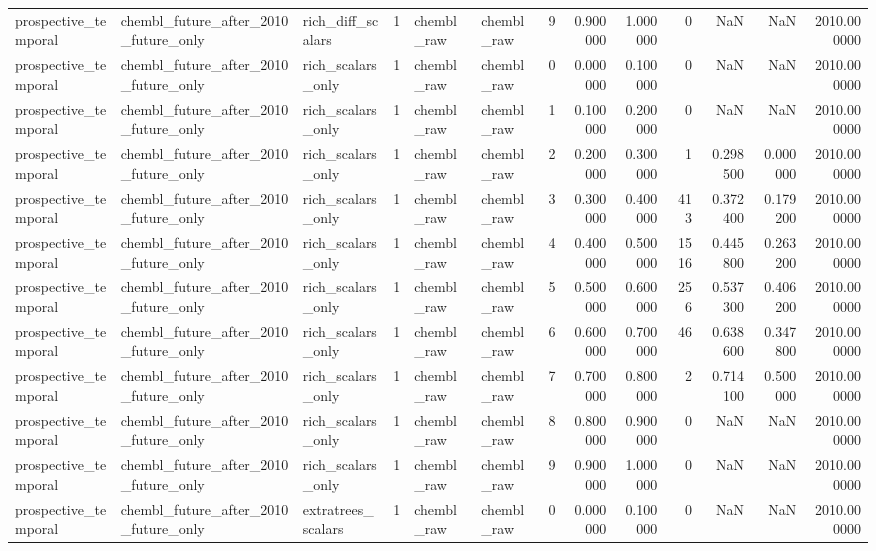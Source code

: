\begin{longtable}{lllrllrrrrrrr}
prospective\_temporal & chembl\_future\_after\_2010\_future\_only & rich\_diff\_scalars & 1 & chembl\_raw & chembl\_raw & 9 & 0.900000 & 1.000000 & 0 & NaN & NaN & 2010.000000 \\
prospective\_temporal & chembl\_future\_after\_2010\_future\_only & rich\_scalars\_only & 1 & chembl\_raw & chembl\_raw & 0 & 0.000000 & 0.100000 & 0 & NaN & NaN & 2010.000000 \\
prospective\_temporal & chembl\_future\_after\_2010\_future\_only & rich\_scalars\_only & 1 & chembl\_raw & chembl\_raw & 1 & 0.100000 & 0.200000 & 0 & NaN & NaN & 2010.000000 \\
prospective\_temporal & chembl\_future\_after\_2010\_future\_only & rich\_scalars\_only & 1 & chembl\_raw & chembl\_raw & 2 & 0.200000 & 0.300000 & 1 & 0.298500 & 0.000000 & 2010.000000 \\
prospective\_temporal & chembl\_future\_after\_2010\_future\_only & rich\_scalars\_only & 1 & chembl\_raw & chembl\_raw & 3 & 0.300000 & 0.400000 & 413 & 0.372400 & 0.179200 & 2010.000000 \\
prospective\_temporal & chembl\_future\_after\_2010\_future\_only & rich\_scalars\_only & 1 & chembl\_raw & chembl\_raw & 4 & 0.400000 & 0.500000 & 1516 & 0.445800 & 0.263200 & 2010.000000 \\
prospective\_temporal & chembl\_future\_after\_2010\_future\_only & rich\_scalars\_only & 1 & chembl\_raw & chembl\_raw & 5 & 0.500000 & 0.600000 & 256 & 0.537300 & 0.406200 & 2010.000000 \\
prospective\_temporal & chembl\_future\_after\_2010\_future\_only & rich\_scalars\_only & 1 & chembl\_raw & chembl\_raw & 6 & 0.600000 & 0.700000 & 46 & 0.638600 & 0.347800 & 2010.000000 \\
prospective\_temporal & chembl\_future\_after\_2010\_future\_only & rich\_scalars\_only & 1 & chembl\_raw & chembl\_raw & 7 & 0.700000 & 0.800000 & 2 & 0.714100 & 0.500000 & 2010.000000 \\
prospective\_temporal & chembl\_future\_after\_2010\_future\_only & rich\_scalars\_only & 1 & chembl\_raw & chembl\_raw & 8 & 0.800000 & 0.900000 & 0 & NaN & NaN & 2010.000000 \\
prospective\_temporal & chembl\_future\_after\_2010\_future\_only & rich\_scalars\_only & 1 & chembl\_raw & chembl\_raw & 9 & 0.900000 & 1.000000 & 0 & NaN & NaN & 2010.000000 \\
prospective\_temporal & chembl\_future\_after\_2010\_future\_only & extratrees\_scalars & 1 & chembl\_raw & chembl\_raw & 0 & 0.000000 & 0.100000 & 0 & NaN & NaN & 2010.000000 \\

\end{longtable}
